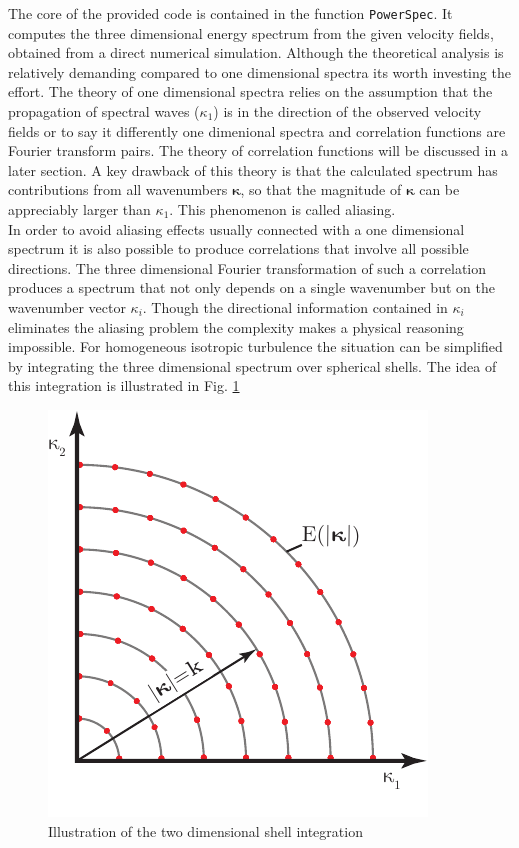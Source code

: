 \documentclass[preprint,12pt,ntfdMod]{elsarticle}
\begin{document}
\begin{par}

The core of the provided code is contained in the function
\lstinline!PowerSpec!. It computes the three dimensional energy spectrum
from the given velocity fields, obtained from a direct numerical
simulation. Although the theoretical analysis is
relatively demanding compared to one dimensional spectra its worth
investing the effort. The theory of one dimensional spectra relies
on the assumption that the propagation of spectral waves ($\kappa_1$)
is in the
direction of the observed velocity fields or to say it differently one
dimenional spectra and correlation functions are Fourier transform pairs.
The theory of correlation functions will be discussed in a later section.
A key drawback of this theory is that the calculated spectrum has
contributions from all wavenumbers $\boldsymbol\kappa$, so that the
magnitude of $\boldsymbol\kappa$ can be appreciably larger than
$\kappa_1$. This phenomenon is called aliasing.\\
In order to avoid aliasing effects usually connected with a one
dimensional spectrum it is also possible to produce correlations that
involve all possible directions. The three dimensional Fourier
transformation of such a correlation produces a spectrum that not only
depends on a single wavenumber but on the wavenumber vector $\kappa_i$.
Though the directional information contained in $\kappa_i$ eliminates the
aliasing problem the complexity makes a physical reasoning impossible.
For homogeneous isotropic turbulence the situation can be simplified by
integrating the three dimensional spectrum over spherical shells. The
idea of this integration is illustrated in Fig. \ref{fig:shell_int}
\begin{figure}
  \centering
  \includegraphics[scale=1]{shell_integration}
  \caption{Illustration of the two dimensional shell integration}
  \label{fig:shell_int}
\end{figure}

\end{par} \vspace{1em}
\end{document}
